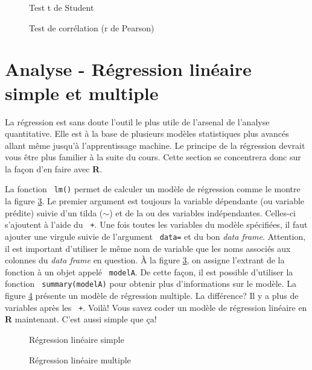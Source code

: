 \documentclass[10.5pt,a4paper]{article}
\newcommand{\rcode}[1]{\texttt{\color{rstudio} #1}}
\begin{document}
  \begin{figure}[H]
    \centering
    \caption{Test t de Student}
    \label{anaTtest}
    \end{figure}
    
    \begin{figure}[H]
    \centering
    \caption{Test de corrélation (r de Pearson)}
    \label{anaPearCorr}
    \end{figure}
  
  \section{Analyse - Régression linéaire simple et multiple}
  La régression est sans doute l'outil le plus utile de l'arsenal de l'analyse quantitative. Elle est à la base de plusieurs modèles statistiques plus avancés allant même jusqu'à l'apprentissage machine. Le principe de la régression devrait vous être plus familier à la suite du cours. Cette section se concentrera donc sur la façon d'en faire avec \textbf{R}.

  La fonction \rcode{lm()} permet de calculer un modèle de régression comme le montre la figure \ref{anaReg1}. Le premier argument est toujours la variable dépendante (ou variable prédite) suivie d'un tilda ($\sim$) et de la ou des variables indépendantes. Celles-ci s'ajoutent à l'aide du \rcode{+}. Une fois toutes les variables du modèle spécifiées, il faut ajouter une virgule suivie de l'argument \rcode{data=} et du bon \textit{data frame}. Attention, il est important d'utiliser le même nom de variable que les noms associés aux colonnes du \textit{data frame} en question. À la figure \ref{anaReg1}, on assigne l'extrant de la fonction à un objet appelé \rcode{modelA}. De cette façon, il est possible d'utiliser la fonction \rcode{summary(modelA)} pour obtenir plus d'informations sur le modèle. La figure \ref{anaReg2} présente un modèle de régression multiple. La différence? Il y a plus de variables après les \rcode{+}. Voilà! Vous savez coder un modèle de régression linéaire en \textbf{R} maintenant. C'est aussi simple que ça!  
  
     \begin{figure}[H]
    \centering
    \caption{Régression linéaire simple}
    \label{anaReg1}
    \end{figure}
    
      \begin{figure}[H]
    \centering
    \caption{Régression linéaire multiple}
    \label{anaReg2}
    \end{figure}
\end{document}
